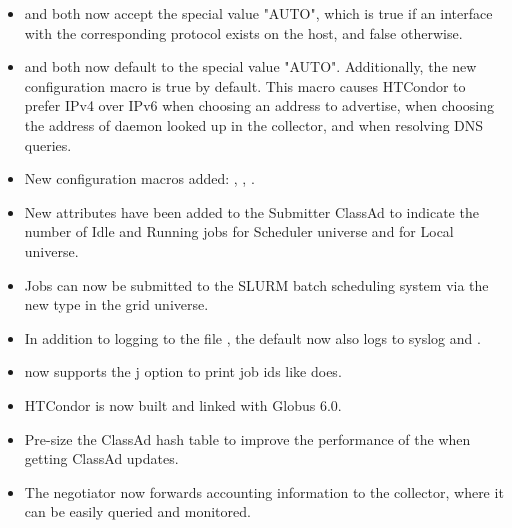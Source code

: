 \begin{itemize}

\item {} and  both now accept
the special value "AUTO", which is true if an interface with the corresponding
protocol exists on the host, and false otherwise.

\item {} and  both now default
to the special value "AUTO".  Additionally, the new configuration macro
 is true by default.  This macro causes HTCondor to
prefer IPv4 over IPv6 when choosing an address to advertise, when choosing
the address of daemon looked up in the collector, and when resolving DNS
queries.

\item New configuration macros added: ,
, .

\item New attributes have been added to the Submitter ClassAd to indicate
the number of Idle and Running jobs for Scheduler universe and for Local
universe.

\item Jobs can now be submitted to the SLURM batch scheduling system via
the new  type in the grid universe.

\item In addition to logging to the file ,
the default  now also logs to
syslog and .

\item {}  now supports the j option to print
job ids like  does.

\item HTCondor is now built and linked with Globus 6.0.

\item Pre-size the ClassAd hash table to improve the performance of the
 when getting ClassAd updates.

\item The negotiator now forwards accounting information to the collector,
where it can be easily queried and monitored.

\end{itemize}

